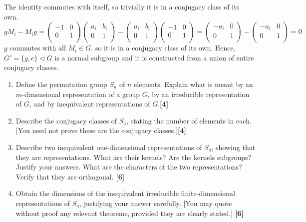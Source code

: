 \documentclass[a4paper]{article}
\begin{document}
\begin{ans}
\begin{enumerate}[label=(\alph*)]
The identity commutes with itself, so trivially it is in a conjugacy class of its own. 
$$gM_i-M_ig=\begin{pmatrix}-1&0\\0&1\\\end{pmatrix}\begin{pmatrix}a_i&b_i\\0&1\\\end{pmatrix}-\begin{pmatrix}a_i&b_i\\0&1\\\end{pmatrix}\begin{pmatrix}-1&0\\0&1\\\end{pmatrix}=\begin{pmatrix}-a_i&0\\0&1\\\end{pmatrix}-\begin{pmatrix}-a_i&0\\0&1\\\end{pmatrix}=0$$
$g$ commutes with all $M_i\in G$, so it is in a conjugacy class of its own. Hence, $G'=\{g,e\}\lhd G$ is a normal subgroup and it is constructed from a union of entire conjugacy classes.
\end{enumerate}
\end{ans}
\newpage
\begin{qns}\leavevmode
\begin{enumerate}[label=(\alph*)]
\item Define the permutation group $S_n$ of $n$ elements. Explain what is meant by an $m$-dimensional representation of a group $G$, by an irreducible representation of $G$, and by inequivalent representations of $G$.\hfill\textbf{[4]}
\item Describe the conjugacy classes of $S_4$, stating the number of elements in each. [You need not prove these are the conjugacy classes.]\hfill\textbf{[4]}
\item Describe two inequivalent one-dimensional representations of $S_4$, showing that they are representations. What are their kernels? Are the kernels subgroups? Justify your answers. What are the characters of the two representations? Verify that they are orthogonal. \hfill\textbf{[6]}
\item Obtain the dimensions of the inequivalent irreducible finite-dimensional representations of $S_4$, justifying your answer carefully. [You may quote without proof any relevant theorems, provided they are clearly stated.] \hfill\textbf{[6]}
\end{enumerate}
\end{qns}
\end{document}
